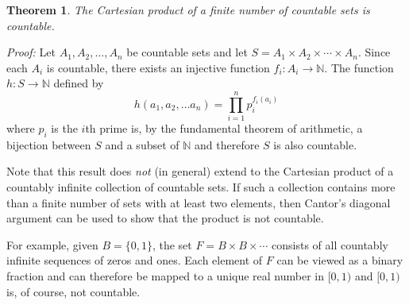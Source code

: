 \documentclass[12pt]{article}
\begin{document}
\newtheorem{thm}{Theorem}
\begin{thm}
The Cartesian product of a finite number of countable sets is countable.
\end{thm}

\emph{Proof:}
Let $A_1, A_2, \ldots, A_n$ be countable sets and let
$S = A_1 \times A_2 \times \cdots \times A_n$.
Since each $A_i$ is countable, there exists an injective function
$f_i\colon A_i \to \mathbb{N}$.
The function $h\colon S \to \mathbb{N}$ defined by
\[
  h(a_1, a_2, \ldots a_n) = \prod_{i=1}^n p_i^{f_i(a_i)}
\]
where $p_i$ is the $i$th prime
is, by the fundamental theorem of arithmetic, a bijection between
$S$ and a subset of $\mathbb{N}$ and therefore $S$ is also countable.

Note that this result does \emph{not} (in general) extend to the
Cartesian product of a countably infinite collection of countable
sets.  If such a collection contains more than a finite number of sets
with at least two elements, then Cantor's diagonal argument can be
used to show that the product is not countable.

For example, given $B = \{0, 1\}$, the set $F = B \times B \times
\cdots$ consists of all countably infinite sequences of zeros and ones.
Each element of $F$ can be viewed as a binary fraction and can
therefore be mapped to a unique
real number in $[0, 1)$ and $[0, 1)$ is, of course, not countable.

\end{document}
